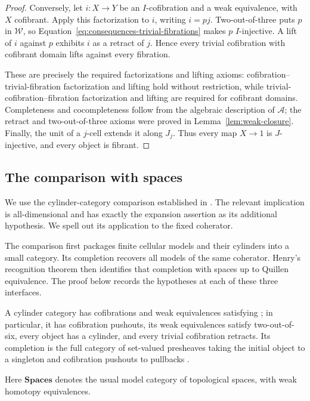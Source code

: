 \documentclass[11pt,letterpaper]{article}
\numberwithin{equation}{section}
\theoremstyle{plain}
\theoremstyle{definition}
\theoremstyle{remark}
\begin{document}
\begin{proof}
Conversely, let \(i:X\to Y\) be an \(I\)-cofibration and a weak
equivalence, with \(X\) cofibrant.  Apply this factorization to \(i\),
writing \(i=pj\).  Two-out-of-three puts \(p\) in \(\mathcal W\),
so Equation~\eqref{eq:consequences-trivial-fibrations} makes \(p\)
\(I\)-injective.  A lift of \(i\) against \(p\) exhibits \(i\)
as a retract of \(j\).  Hence every trivial cofibration with
cofibrant domain lifts against every fibration.

These are precisely the required factorizations and lifting axioms:
cofibration--trivial-fibration factorization and lifting hold without
restriction, while trivial-cofibration--fibration factorization and
lifting are required for cofibrant domains.  Completeness and
cocompleteness follow from the algebraic description of \(\mathcal A\);
the retract and two-out-of-three axioms were proved in
Lemma~\ref{lem:weak-closure}.  Finally, the unit of a \(j\)-cell
extends it along \(J_j\).  Thus every map \(X\to 1\) is
\(J\)-injective, and every object is fibrant.
\end{proof}

\subsection{The comparison with spaces}

We use the cylinder-category comparison established in
\cite[Sections~5.1 and~5.3]{Henry2016}.  The relevant implication is
all-dimensional and has exactly the expansion assertion as its
additional hypothesis.  We spell out its application to the fixed
coherator.

The comparison first packages finite cellular models and their
cylinders into a small category.  Its completion recovers all models
of the same coherator.  Henry's recognition theorem then identifies
that completion with spaces up to Quillen equivalence.  The proof
below records the hypotheses at each of these three interfaces.

A cylinder category has cofibrations and weak equivalences satisfying
\cite[Definition~2.1.1]{Henry2016}; in particular, it has cofibration
pushouts, its weak equivalences satisfy two-out-of-six, every object
has a cylinder, and every trivial cofibration retracts.  Its completion
is the full category of set-valued presheaves taking the initial object
to a singleton and cofibration pushouts to pullbacks
\cite[Definition~2.4.1]{Henry2016}.

Here \(\mathbf{Spaces}\) denotes the usual model category of topological spaces,
with weak homotopy equivalences.
\end{document}
